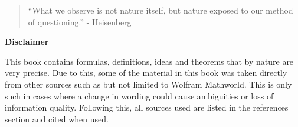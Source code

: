 \begin{quotation}
	``What we observe is not nature itself, but nature exposed to our method of questioning.'' - Heisenberg
\end{quotation}

\begin{center}
	\textbf{Disclaimer}
\end{center}

This book contains formulas, definitions, ideas and theorems that by nature are very precise. Due to this, some of the material in this book was taken directly from other sources such as but not limited to Wolfram Mathworld. This is only such in cases where a change in wording could cause ambiguities or loss of information quality.  Following this, all sources used are listed in the references section and cited when used.
